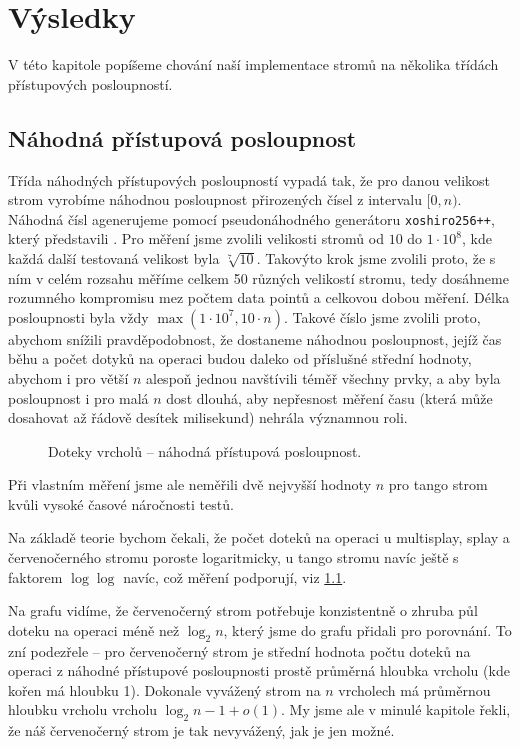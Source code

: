 \chapter{Výsledky}

V této kapitole popíšeme chování naší implementace stromů na několika třídách přístupových posloupností.

\section{Náhodná přístupová posloupnost}

Třída náhodných přístupových posloupností vypadá tak, že pro danou velikost
strom vyrobíme náhodnou posloupnost přirozených čísel z intervalu $[0,n)$.
Náhodná čísl agenerujeme pomocí pseudonáhodného generátoru {\tt xoshiro256++},
který představili \citet{xoshiro}. Pro měření jsme zvolili velikosti stromů od $10$ do $1\cdot
10^8$, kde každá další testovaná velikost byla $\sqrt[7]{10}$. Takovýto krok
jsme zvolili proto, že s ním v celém rozsahu měříme celkem 50 různých velikostí
stromu, tedy dosáhneme rozumného kompromisu mez počtem data pointů a celkovou
dobou měření. Délka posloupnosti byla vždy $\max(1\cdot10^7, 10\cdot n)$.
Takové číslo jsme zvolili proto, abychom snížili pravděpodobnost, že dostaneme
náhodnou posloupnost, jejíž čas běhu a počet dotyků na operaci budou daleko od
příslušné střední hodnoty, abychom i pro větší $n$ alespoň jednou navštívili
téměř všechny prvky, a aby byla posloupnost i pro malá $n$ dost dlouhá, aby
nepřesnost měření času (která může dosahovat až řádově desítek milisekund)
nehrála významnou roli. 

\def\graphfigure#1#2{
\begin{figure}[h!]
\centering
\caption{#2}
\label{obr:#1}
\end{figure}
}

\graphfigure{touch_r}{Doteky vrcholů -- náhodná přístupová posloupnost.}


Při vlastním měření jsme ale neměřili dvě nejvyšší hodnoty $n$ pro tango strom kvůli vysoké časové náročnosti testů.

Na základě teorie bychom čekali, že počet doteků na operaci u multisplay, splay a červenočerného stromu poroste logaritmicky, u tango stromu navíc ještě s faktorem $\log\log$ navíc, což měření podporují, viz \ref{obr:touch_r}.
\let\oldlog\log
\def\log{\oldlog_2}

Na grafu vidíme, že červenočerný strom potřebuje konzistentně o zhruba
půl doteku na operaci méně než $\log n$, který jsme do grafu přidali pro
porovnání. To zní podezřele -- pro červenočerný strom je střední hodnota počtu doteků na operaci z náhodné přístupové posloupnosti prostě průměrná hloubka vrcholu (kde kořen má hloubku 1). Dokonale vyvážený strom na $n$ vrcholech má průměrnou hloubku vrcholu vrcholu $\log n - 1 + o(1)$. My jsme ale v minulé kapitole řekli, že náš červenočerný strom je tak nevyvážený, jak je jen možné.

